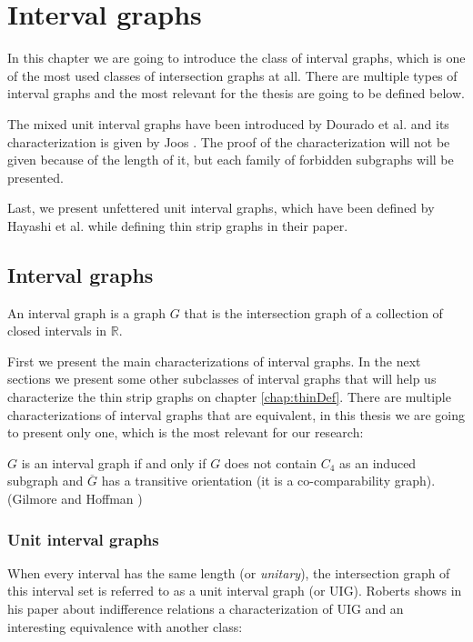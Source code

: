 \chapter{Interval graphs}
\label{chap:interval}

In this chapter we are going to introduce the class of interval graphs, which is
 one of the most used classes of intersection graphs at all. There are multiple types of
 interval graphs and the most relevant for the thesis are going to be defined below.

The mixed unit interval graphs have been introduced by Dourado et al.
\cite{douradoMixedUnitInterval2012} and its characterization is given by Joos
\cite{joosCharacterizationMixedUnit2013}. The proof of the characterization will not
be given because of the length of it, but each family of forbidden subgraphs will be
presented.

Last, we present unfettered unit interval graphs, which have been defined by Hayashi et al. \cite{hayashiThinStripGraphs2017} while
defining thin strip graphs in their paper.

\section{Interval graphs}

An interval graph is a graph $G$ that is the intersection graph of a collection
of closed intervals in $\mathbb{R}$.

First we present the main characterizations of interval graphs. In the next sections we present some other subclasses of interval graphs that will help us characterize the thin strip graphs on chapter \ref{chap:thinDef}. There are multiple characterizations of interval graphs that are equivalent, in this thesis we are going to present only one, which is the most relevant for our research:

\begin{theorem}
  \label{theo:intervalChord}
  $G$ is an interval graph if and only if $G$ does not contain $C_4$ as an induced subgraph and $\overline{G}$ has a transitive orientation (it is a co-comparability graph). (Gilmore and Hoffman \cite{gilmoreCharacterizationComparabilityGraphs1964})
\end{theorem}


\subsection{Unit interval graphs}
When every interval has the same length (or \emph{unitary}), the intersection graph of this interval set is referred to as a unit interval graph (or UIG).
Roberts \cite{roberts1968representations} shows in his paper about indifference relations a characterization of UIG and an interesting equivalence with another class:

